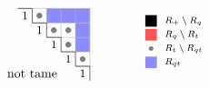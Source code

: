 \documentclass[dvipsnames]{beamer}
\theoremstyle{definition}
\newcommand{\qtrootcolor}{blue!45}
\begin{document}
\begin{frame}
\begin{align*}
\qquad \qquad
\begin{tikzpicture}[scale = .4]
\draw[draw = none, fill = \qtrootcolor] (3,-1) rectangle (4,-2);
 \draw[draw = none, fill = \qtrootcolor] (4,-1) rectangle (5,-2);
 \draw[draw = none, fill = \qtrootcolor] (5,-1) rectangle (6,-2);
 \draw[draw = none, fill = \qtrootcolor] (5,-2) rectangle (6,-3);
 \draw[draw = none, fill = \qtrootcolor] (5,-3) rectangle (6,-4);
 \draw[draw = none, fill = gray!100] (2+0.5, -1-0.5) circle (.2);
\draw[draw = none, fill = gray!100] (3+0.5, -2-0.5) circle (.2);
\draw[draw = none, fill = gray!100] (4+0.5, -2-0.5) circle (.2);
\draw[draw = none, fill = gray!100] (4+0.5, -3-0.5) circle (.2);
\draw[draw = none, fill = gray!100] (5+0.5, -4-0.5) circle (.2);
\draw[thin, black!31] (1,-1) -- (6,-1);
\draw[thin, black!31] (2,-1) -- (2,-1);
\draw[thin, black!31] (2,-2) -- (6,-2);
\draw[thin, black!31] (3,-2) -- (3,-1);
\draw[thin, black!31] (3,-3) -- (6,-3);
\draw[thin, black!31] (4,-3) -- (4,-1);
\draw[thin, black!31] (4,-4) -- (6,-4);
\draw[thin, black!31] (5,-4) -- (5,-1);
\draw[thin, black!31] (5,-5) -- (6,-5);
\draw[thin, black!31] (6,-5) -- (6,-1);
\draw[thin] (1,-1) -- (2,-1);
\draw[thin] (2,-1) -- (2,-2);
\draw[thin] (2,-2) -- (3,-2);
\draw[thin] (3,-2) -- (3,-3);
\draw[thin] (3,-3) -- (4,-3);
\draw[thin] (4,-3) -- (4,-4);
\draw[thin] (4,-4) -- (5,-4);
\draw[thin] (5,-4) -- (5,-5);
\draw[thin] (5,-5) -- (6,-5);
\draw[thin] (6,-5) -- (6,-6);
\node at (3/2,-3/2) {\small $1 $};
\node at (5/2,-5/2) {\small $1 $};
\node at (7/2,-7/2) {\small $1 $};
\node at (9/2,-9/2) {\small $1 $};
\node at (11/2,-11/2) {\small $1 $};
\node at (4/2,-11/2) {not tame};
\end{tikzpicture}
\quad \quad \quad \quad
\raisebox{3mm}{
\begin{tikzpicture}[scale = .32]
\begin{scope}
\draw[draw = none, fill = black!100] (2,-1) rectangle (3,-2);
\node[anchor = west] at (3,-1.5) {\scriptsize  \  $R_+ \setminus R_q$};
\end{scope}
\begin{scope}[yshift = -34*1]
\draw[draw = none, fill = red!68] (2,-1) rectangle (3,-2);
\node[anchor = west] at (3,-1.5) {\scriptsize  \  $R_q \setminus R_t$};
\end{scope}
\begin{scope}[yshift = -34*2]
\draw[thin, black!0] (2,-1) -- (3,-1);
\draw[thin, black!0] (2,-1) -- (2,-2);
\draw[thin, black!0] (2,-2) -- (3,-2);
\draw[thin, black!0] (3,-2) -- (3,-1);
\draw[draw = none, fill = gray!100] (2+0.5, -1-0.5) circle (.2);
\node[anchor = west] at (3,-1.5) {\scriptsize  \  $R_t \setminus R_{qt}$};
\end{scope}
\begin{scope}[yshift = -34*3]
\draw[draw = none, fill = \qtrootcolor] (2,-1) rectangle (3,-2);
\node[anchor = west] at (3,-1.5) {\scriptsize \  $R_{qt}$};
\end{scope}
\end{tikzpicture}}
\end{align*}


\end{frame}
\end{document}
